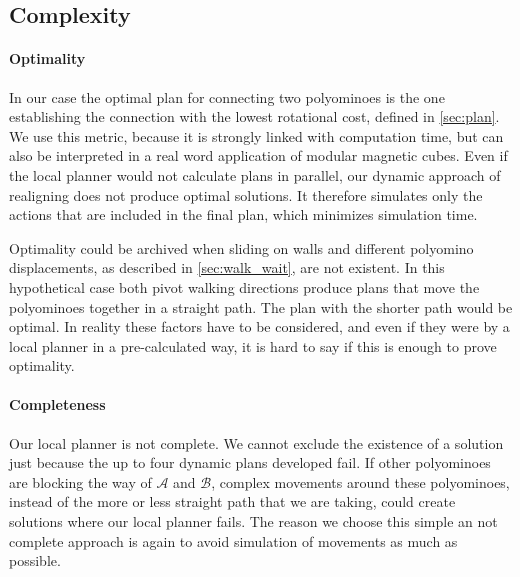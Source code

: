 \subsection{Complexity}
\label{sec:local_complex}

\paragraph{Optimality}

In our case the optimal plan for connecting two polyominoes is the one establishing the connection with the lowest rotational cost, defined in \autoref{sec:plan}.
We use this metric, because it is strongly linked with computation time, but can also be interpreted in a real word application of modular magnetic cubes.
Even if the local planner would not calculate plans in parallel, our dynamic approach of realigning does not produce optimal solutions.
It therefore simulates only the actions that are included in the final plan, which minimizes simulation time.

Optimality could be archived when sliding on walls and different polyomino displacements, as described in \autoref{sec:walk_wait}, are not existent.
In this hypothetical case both pivot walking directions produce plans that move the polyominoes together in a straight path.
The plan with the shorter path would be optimal.
In reality these factors have to be considered, and even if they were by a local planner in a pre-calculated way, it is hard to say if this is enough to prove optimality.

\paragraph{Completeness}

Our local planner is not complete.
We cannot exclude the existence of a solution just because the up to four dynamic plans developed fail.
If other polyominoes are blocking the way of $\mathcal{A}$ and $\mathcal{B}$, complex movements around these polyominoes, instead of the more or less straight path that we are taking, could create solutions where our local planner fails.
The reason we choose this simple an not complete approach is again to avoid simulation of movements as much as possible. 




